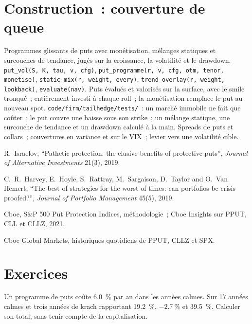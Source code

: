 \section{Construction~: couverture de queue}\label{bld:s2:tail-hedging-and-long-volatility:tailhedge}

\begin{build}
 Programmes glissants de puts avec monétisation, mélanges statiques et surcouches de tendance, jugés sur la croissance, la volatilité et le drawdown.
 \texttt{put\_vol(S, K, tau, v, cfg)}, \texttt{put\_programme(r, v, cfg, otm, tenor, monetise)},
\texttt{static\_mix(r, weight, every)}, \texttt{trend\_overlay(r, weight, lookback)}, \texttt{evaluate(nav)}.
 Puts évalués et valorisés sur la surface, avec le smile tronqué~; entièrement investi à chaque roll~; la monétisation remplace le put au
nouveau spot.
 \texttt{code/firm/tailhedge/tests/}~: un marché immobile ne fait que coûter~; le put couvre une baisse sous son strike~; un mélange statique, une
surcouche de tendance et un drawdown calculé à la main.
 Spreads de puts et collars~; couvertures en variance et sur le VIX~; levier vers une volatilité cible.
\end{build}

\begin{omsources}
\item R.~Israelov, ``Pathetic protection: the elusive benefits of protective puts'', \emph{Journal of Alternative Investments} 21(3), 2019.
\item C.~R.~Harvey, E.~Hoyle, S.~Rattray, M.~Sargaison, D.~Taylor and O.~Van Hemert, ``The best of strategies for the worst of times: can portfolios be
crisis proofed?'', \emph{Journal of Portfolio Management} 45(5), 2019.
\item Cboe, S\&P 500 Put Protection Indices, méthodologie~; Cboe Insights sur PPUT, CLL et CLLZ, 2021.
\item Cboe Global Markets, historiques quotidiens de PPUT, CLLZ et SPX.
\end{omsources}

\section{Exercices}

\begin{exercise}[$\star$]\label{exo:s2:tail-hedging-and-long-volatility:1}
Un programme de puts coûte 6.0~\% par an dans les années calmes. Sur 17 années calmes et trois années de krach rapportant 19.2~\%, $-2.7~\%$ et 39.5~\%.
Calculer son total, sans tenir compte de la capitalisation.
\end{exercise}

